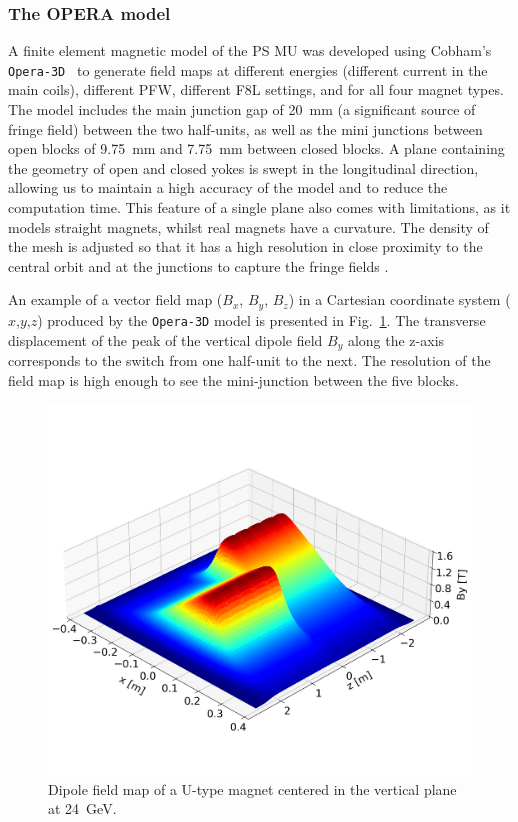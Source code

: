 \subsubsection{The OPERA model}

A finite element magnetic model of the PS MU was developed using Cobham's \texttt{Opera-3D}~\cite{noauthor_opera_nodate, anglada_pxmu_hrcwp_nodate} to generate field maps at different energies (different current in the main coils), different PFW, different F8L settings, and for all four magnet types. The model includes the main junction gap of \SI{20}{mm} (a significant source of fringe field) between the two half-units, as well as the mini junctions between open blocks of \SI{9.75}{mm} and \SI{7.75}{mm} between closed blocks. A plane containing the geometry of open and closed yokes is swept in the longitudinal direction, allowing us to maintain a high accuracy of the model and to reduce the computation time. This feature of a single plane also comes with limitations, as it models straight magnets, whilst real magnets have a curvature. The density of the mesh is adjusted so that it has a high resolution in close proximity to the central orbit and at the junctions to capture the fringe fields \cite{anglada_reference_2019}.

An example of a vector field map ($B_x$, $B_y$, $B_z$) in a Cartesian coordinate system ($x$,$y$,$z$) produced by the \texttt{Opera-3D} model is presented in Fig.~\ref{fig:dipole_field}. The transverse displacement of the peak of the vertical dipole field $B_{y}$ along the z-axis corresponds to the switch from one half-unit to the next. The resolution of the field map is high enough to see the mini-junction between the five blocks.

\begin{figure}[!htb]
   \centering
   \includegraphics*[width=0.7\columnwidth, trim={0 2.9cm 0 4.3cm},clip]{01_Introduction/images/dipole_field.png}
   \caption{Dipole field map of a U-type magnet centered in the vertical plane at \SI{24}{GeV}.}
   \label{fig:dipole_field}
\end{figure}

